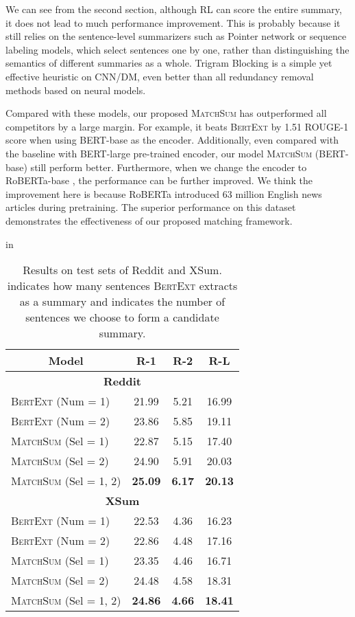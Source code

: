 \documentclass[11pt,a4paper]{article}
\begin{document}
We can see from the second section, although RL can score the entire summary, it does not lead to much performance improvement. This is probably because it still relies on the sentence-level summarizers such as Pointer network or sequence labeling models, which select sentences one by one, rather than distinguishing the semantics of different summaries as a whole. Trigram Blocking is a simple yet effective heuristic on CNN/DM, even better than all redundancy removal methods based on neural models.

Compared with these models, our proposed \textsc{MatchSum} has outperformed all competitors by a large margin. For example, it beats \textsc{BertExt} by 1.51 ROUGE-1 score when using BERT-base as the encoder. Additionally, even compared with the baseline with BERT-large pre-trained encoder, our model \textsc{MatchSum} (BERT-base) still perform better. Furthermore, when we change the encoder to RoBERTa-base \cite{liu2019roberta}, the performance can be further improved. We think the improvement here is because RoBERTa introduced 63 million English news articles during pretraining. The superior performance on this dataset demonstrates the effectiveness of our proposed matching framework.



\renewcommand\arraystretch{1.2}
\begin{table}[t]
\center \footnotesize
{} in
\begin{tabular}{lccc}
\toprule
\multicolumn{1}{c}{\textbf{Model}} & \textbf{R-1} & \textbf{R-2} & \textbf{R-L} \\
\midrule
\multicolumn{4}{c}{\textbf{Reddit}} \\
\midrule
\textsc{BertExt} (Num = 1) & 21.99 & 5.21	& 16.99 \\
\textsc{BertExt} (Num = 2) & 23.86 & 5.85	& 19.11 \\
\textsc{MatchSum} (Sel = 1) & 22.87 & 5.15 & 17.40 \\
\textsc{MatchSum} (Sel = 2) & 24.90 & 5.91 & 20.03 \\
\textsc{MatchSum} (Sel = 1, 2) & \textbf{25.09} & \textbf{6.17} & \textbf{20.13} \\

\midrule
\multicolumn{4}{c}{\textbf{XSum}} \\
\midrule
\textsc{BertExt} (Num = 1) & 22.53 & 4.36 & 16.23 \\
\textsc{BertExt} (Num = 2) & 22.86 & 4.48 & 17.16 \\
\textsc{MatchSum} (Sel = 1) & 23.35 & 4.46 & 16.71 \\
\textsc{MatchSum} (Sel = 2) & 24.48	& 4.58 & 18.31 \\
\textsc{MatchSum} (Sel = 1, 2) & \textbf{24.86} & \textbf{4.66} & \textbf{18.41} \\

\bottomrule
\end{tabular}
\caption{Results on test sets of Reddit and XSum.  indicates how many sentences \textsc{BertExt} extracts as a summary and  indicates the number of sentences we choose to form a candidate summary.} \label{tab:abstractive datasets}
\end{table}
\end{document}
